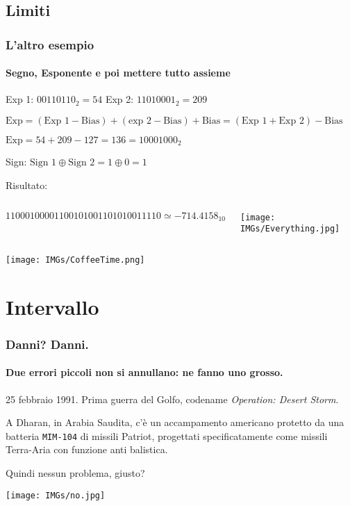 \documentclass{beamer}
\begin{document}
  \subsection{Limiti}
	\begin{frame}
    \frametitle{L'altro esempio}
    \framesubtitle{Segno, Esponente e poi mettere tutto assieme}
   		Exp 1: $00110110_{2} = 54$
   		Exp 2: $11010001_{2} = 209$
   		
   		$\text{Exp} = (\text{Exp 1} - \text{Bias}) + (\text{exp 2} - \text{Bias}) + \text{Bias} = (\text{Exp 1} + \text{Exp 2}) - \text{Bias}$
   		
   		$\text{Exp} = 54 + 209 - 127 = 136 = 10001000_{2}$
   		
   		\vspace{2em}
   		\pause
   		
   		Sign: $\text{Sign 1} \oplus \text{Sign 2} = 1 \oplus 0 = 1$
   		
   		\vspace{2em}
   		\pause
   		
   		Risultato:
   		\begin{columns}
   			$$11000100001100101001101010011110 \simeq -714.4158_{10}$$
   			\pause
   			\begin{center}
		    		\texttt{[image: IMGs/Everything.jpg]}
		    \end{center}
			\end{columns}  
  \end{frame}
  \begin{frame}
  		\begin{center}
		  \texttt{[image: IMGs/CoffeeTime.png]}
		\end{center}
  \end{frame}
  \section{Intervallo}
	  \begin{frame}
	    \frametitle{Danni? Danni.}
	    \framesubtitle{Due errori piccoli non si annullano: ne fanno uno grosso.}
	    25 febbraio 1991. Prima guerra del Golfo, codename \emph{Operation: Desert Storm}.
	    
			\vspace{2em}	    
	    
	    A Dharan, in Arabia Saudita, c'è un accampamento americano protetto da una batteria \texttt{MIM-104} di
	    missili Patriot, progettati specificatamente come missili Terra-Aria con funzione
	    anti balistica.
	    
	    Quindi nessun problema, giusto?
	    
	    \pause
	    
	    \begin{center}
		    		\texttt{[image: IMGs/no.jpg]}
		    \end{center}
	    
	  \end{frame}
	  
\end{document}
